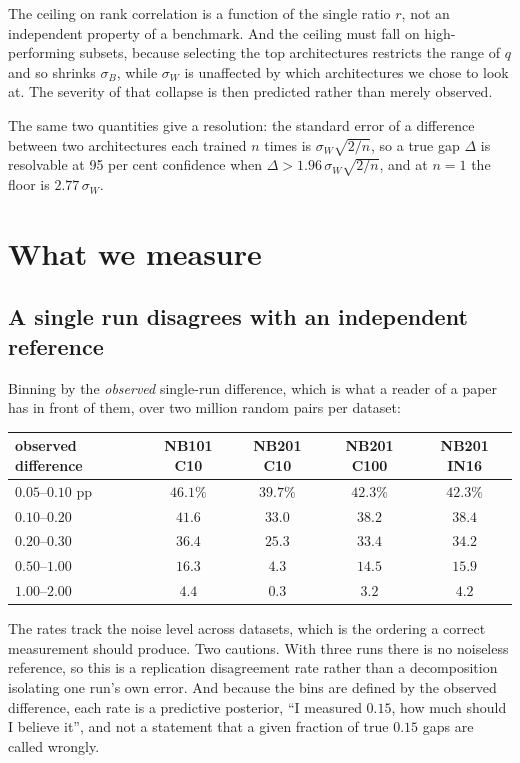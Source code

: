 \documentclass[11pt]{article}
\begin{document}
The ceiling on rank correlation is a function of the single ratio $r$, not an independent property of a
benchmark. And the ceiling must fall on high-performing subsets, because selecting the top architectures
restricts the range of $q$ and so shrinks $\sigma_B$, while $\sigma_W$ is unaffected by which
architectures we chose to look at. The severity of that collapse is then predicted rather than merely
observed.

The same two quantities give a resolution: the standard error of a difference between two architectures
each trained $n$ times is $\sigma_W\sqrt{2/n}$, so a true gap $\Delta$ is resolvable at 95 per cent
confidence when $\Delta > 1.96\,\sigma_W\sqrt{2/n}$, and at $n=1$ the floor is $2.77\,\sigma_W$.

\section{What we measure}\label{sec:results}

\subsection{A single run disagrees with an independent reference}

Binning by the \emph{observed} single-run difference, which is what a reader of a paper has in front of
them, over two million random pairs per dataset:

\begin{center}\small
\begin{tabular}{lcccc}
\toprule
observed difference & NB101 C10 & NB201 C10 & NB201 C100 & NB201 IN16 \\
\midrule
$0.05$--$0.10$ pp & $46.1\%$ & $39.7\%$ & $42.3\%$ & $42.3\%$ \\
$0.10$--$0.20$     & $41.6$   & $33.0$   & $38.2$   & $38.4$ \\
$0.20$--$0.30$     & $36.4$   & $25.3$   & $33.4$   & $34.2$ \\
$0.50$--$1.00$     & $16.3$   & $4.3$    & $14.5$   & $15.9$ \\
$1.00$--$2.00$     & $4.4$    & $0.3$    & $3.2$    & $4.2$ \\
\bottomrule
\end{tabular}
\end{center}

The rates track the noise level across datasets, which is the ordering a correct measurement should
produce. Two cautions. With three runs there is no noiseless reference, so this is a replication
disagreement rate rather than a decomposition isolating one run's own error. And because the bins are
defined by the observed difference, each rate is a predictive posterior, ``I measured $0.15$, how much
should I believe it'', and not a statement that a given fraction of true $0.15$ gaps are called wrongly.
\end{document}
